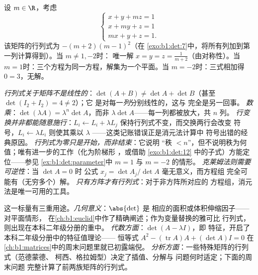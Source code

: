 \begin{example}[含参数的讨论]\label{ex:b1:det:parameter}
设 $m \in \R$，考虑
\[
\begin{cases}
x + y + mz = 1\\
x + my + z = 1\\
mx + y + z = 1 .
\end{cases}
\]
该矩阵的行列式为 $-(m+2)(m-1)^2$（在
\cref{exo:b1:det:7}中，将所有列加到第一列计算得到）。当 $m
\neq 1, -2$时：
唯一解 $x = y = z = \frac{1}{m+2}$（由对称性）。当 $m =
1$时：三个方程为同一方程，解集为一个平面。当 $m =
-2$时：三式相加得 $0 = 3$，无解。
\end{example}

\begin{remark}[常见误区]
\label{rem:b1:det:pitfalls}
\emph{行列式关于矩阵不是线性的}：$\det(A + B)
\neq \det A + \det B$（甚至 $\det(I_2 + I_2) = 4 \neq 2$）；它
是对每一\emph{列}分别线性的，这与
完全是另一回事。
\emph{数乘}：$\det(\lambda A) = \lambda^n\det A$，而非
$\lambda\det A$——每一列都被放大，共 $n$ 列。
\emph{行变换并非都能随意施行}：$L_i \leftarrow L_i +
\lambda L_j$ 保持行列式不变，而交换两行会改变
符号，$L_i \leftarrow \lambda L_i$ 则使其乘以 $\lambda$
——这类记账错误正是消元法计算中
符号出错的经典原因。
\emph{行列式为零只是开始，而非结束}：它说明
“秩 $< n$”，但不说明秩为何值；唯有进一步的工作（化为阶梯形
，或借助 \cref{exo:b1:det:12} 中的子式）方能定位——参见
\cref{ex:b1:det:parameter}中 $m = 1$ 与 $m = -2$ 的情形。
\emph{克莱姆法则需要可逆性}：当 $\det A = 0$ 时
公式 $x_j = \det A_j/\det A$ 毫无意义，而方程组
完全可能有（无穷多个）解。
\emph{只有方阵才有行列式}：对于非方阵所对应的
方程组，消元法是唯一可用的工具。
\end{remark}

\begin{remark}[行列式的用途]
\label{rem:b1:det:whereused}
这一标量有三重用途。\emph{几何意义}：$\abs{\det}$ 是
相应的面积或体积伸缩因子——对平面情形，
在\cref{ch:b1:euclid}中作了精确阐述；作为变量替换的雅可比
行列式，则出现在本科二年级分册的重中。
\emph{代数方面}：$\det(A - \lambda I)$，即
特征，开启了本科二年级分册中的特征值理论——
恒等式 $A^2 - (\operatorname{tr} A)A + (\det A)I = 0$ 在
\cref{ch:b1:matrices}中的周末问题里就已初露端倪。
\emph{分析方面}：一些特殊矩阵的行列式（范德蒙德、
柯西、格拉姆型）决定了插值、分解与
问题何时适定；下面的周末问题
完整计算了前两族矩阵的行列式。
\end{remark}

